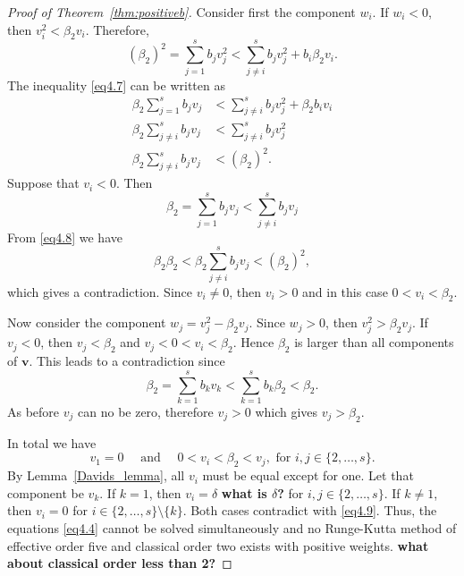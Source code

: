 \begin{proof}[Proof of Theorem~\ref{thm:positiveb}]
    Consider first the component \( w_{i} \). If \( w_{i} < 0 \), then \( v_{i}^{2} < \beta_{2}v_{i} \). Therefore,
    \begin{equation}\label{eq4.7}
        (\beta_{2})^{2} = \sum_{j=1}^{s}b_{j}v_{j}^{2} < \sum_{j \neq i}^{s}b_{j}v_{j}^{2} + b_{i}\beta_{2}v_{i}.
    \end{equation}
    The inequality \eqref{eq4.7} can be written as
    \begin{equation}\label{eq4.8}
        \begin{split}
            \beta_{2}\sum_{j=1}^{s}b_{j}v_{j} &< \sum_{j \neq i}^{s}b_{j}v_{j}^{2} + \beta_{2}b_{i}v_{i} \\
            \beta_{2}\sum_{j \neq i}^{s}b_{j}v_{j} &< \sum_{j \neq i}^{s}b_{j}v_{j}^{2} \\
            \beta_{2}\sum_{j \neq i}^{s}b_{j}v_{j} &< (\beta_{2})^{2}.
        \end{split}
    \end{equation}
    Suppose that \( v_{i} < 0 \). Then
    \begin{equation*}
        \beta_{2} = \sum_{j=1}^{s}b_{j}v_{j} < \sum_{j \neq i}^{s}b_{j}v_{j}
    \end{equation*}
    From \eqref{eq4.8} we have
    \begin{equation*}
            \beta_{2}\beta_{2} < \beta_{2}\sum_{j \neq i}^{s}b_{j}v_{j} < (\beta_{2})^{2},
    \end{equation*}
    which gives a contradiction. Since \( v_{i} \neq 0 \), then \( v_{i} > 0 \) and in this case \( 0 < v_{i} < \beta_{2} \).

    Now consider the component \( w_{j} = v_{j}^{2} - \beta_{2}v_{j} \). Since \( w_{j} > 0 \), then \( v_{j}^{2} > \beta_{2}v_{j} \). If \( v_{j} < 0 \), then \( v_{j} < \beta_{2} \) and \( v_{j} < 0 < v_{i} < \beta_{2} \). Hence \( \beta_{2} \) is larger than all components of \( \bm{v} \). This leads to a contradiction since
    \begin{equation*}
            \beta_{2} = \sum_{k=1}^{s}b_{k}v_{k} < \sum_{k=1}^{s}b_{k}\beta_{2} < \beta_{2}.
    \end{equation*}
    As before \( v_{j} \) can no be zero, therefore \( v_{j} > 0 \) which gives \( v_{j} > \beta_{2} \).

    In total we have
    \begin{equation}\label{eq4.9}
        v_{1} = 0 \quad \text{ and } \quad 0 < v_{i} < \beta_{2} < v_{j}, \text{ for } i,j \in \{2,\dots,s\}.
    \end{equation}
    By Lemma~\ref{Davids_lemma}, all \( v_{i} \) must be equal except for one.
    Let that component be \( v_{k} \). If \( k = 1 \), then \( v_{i} = \delta
    \) {\bf what is $\delta$?} for \( i,j \in \{2,\dots,s\} \). If \( k \neq 1
    \), then \( v_{i} = 0 \) for \( i \in \{2,\dots,s\}\setminus\{k\} \). Both
    cases contradict with \eqref{eq4.9}. Thus, the equations \eqref{eq4.4}
    cannot be solved simultaneously and no Runge-Kutta method of
    effective order five and classical order two exists with positive weights.
    {\bf what about classical order less than 2?}



\end{proof}
